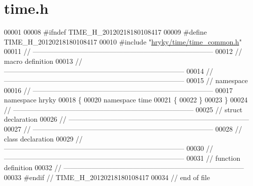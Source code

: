 \hypertarget{time_8h_source}{\section{time.\-h}
}

\begin{DoxyCode}
00001 
00008 \textcolor{preprocessor}{#ifndef TIME\_H\_20120218180108417}
00009 \textcolor{preprocessor}{}\textcolor{preprocessor}{#define TIME\_H\_20120218180108417}
00010 \textcolor{preprocessor}{}\textcolor{preprocessor}{#include "\hyperlink{time__common_8h}{hryky/time/time_common.h}"}
00011 \textcolor{comment}{//
      ------------------------------------------------------------------------------}
00012 \textcolor{comment}{// macro definition}
00013 \textcolor{comment}{//
      ------------------------------------------------------------------------------}
00014 \textcolor{comment}{//
      ------------------------------------------------------------------------------}
00015 \textcolor{comment}{// namespace}
00016 \textcolor{comment}{//
      ------------------------------------------------------------------------------}
00017 \textcolor{keyword}{namespace }hryky
00018 \{
00020 \textcolor{keyword}{namespace }time
00021 \{
00022 \}
00023 \}
00024 \textcolor{comment}{//
      ------------------------------------------------------------------------------}
00025 \textcolor{comment}{// struct declaration}
00026 \textcolor{comment}{//
      ------------------------------------------------------------------------------}
00027 \textcolor{comment}{//
      ------------------------------------------------------------------------------}
00028 \textcolor{comment}{// class declaration}
00029 \textcolor{comment}{//
      ------------------------------------------------------------------------------}
00030 \textcolor{comment}{//
      ------------------------------------------------------------------------------}
00031 \textcolor{comment}{// function definition}
00032 \textcolor{comment}{//
      ------------------------------------------------------------------------------}
00033 \textcolor{preprocessor}{#endif // TIME\_H\_20120218180108417}
00034 \textcolor{preprocessor}{}\textcolor{comment}{// end of file}
\end{DoxyCode}
